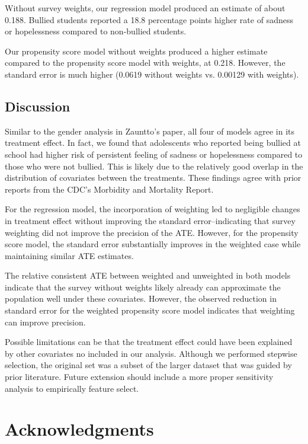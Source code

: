\documentclass[12pt]{article}
\begin{document}
Without survey weights, our regression model produced an estimate of about 0.188. Bullied students reported a 18.8 percentage points higher rate of sadness or hopelessness compared to non-bullied students.

Our propensity score model without weights produced a higher estimate compared to the propensity score model with weights, at 0.218. However, the standard error is much higher (0.0619 without weights vs. 0.00129 with weights).


\subsection{Discussion} \label{subsec:ExtDiscuss}

Similar to the gender analysis in Zauntto's paper, all four of models agree in its treatment effect. In fact, we found that adolescents who reported being bullied at school had higher risk of persistent feeling of sadness or hopelessness compared to those who were not bullied. This is likely due to the relatively good overlap in the distribution of covariates between the treatments. These findings agree with prior reports from the CDC's Morbidity and Mortality Report. 

For the regression model, the incorporation of weighting led to negligible changes in treatment effect without improving the standard error--indicating that survey weighting did not improve the precision of the ATE. However, for the propensity score model, the standard error substantially improves in the weighted case while maintaining similar ATE estimates. 

The relative consistent ATE between weighted and unweighted in both models indicate that the survey without weights likely already can approximate the population well under these covariates. However, the observed reduction in standard error for the weighted propensity score model indicates that weighting can improve precision.

Possible limitations can be that the treatment effect could have been explained by other covariates no included in our analysis. Although we performed stepwise selection, the original set was a subset of the larger dataset that was guided by prior literature. Future extension should include a more proper sensitivity analysis to empirically feature select.

\newpage

\section{Acknowledgments}
\end{document}
